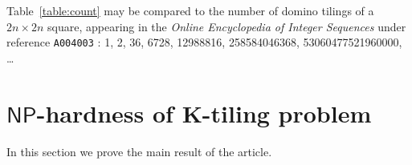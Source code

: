 \documentclass[11pt,a4paper]{article}
\newtheorem{fact}{\textbf{Fact}}
\newcommand{\1}{\mathbb{1}}
\newcommand{\0}{\mathbb{0}}
\newcommand{\NP}{{\mathsf{NP}}}
\newcommand{\hdomino}[2]{\raisebox{-4pt}{\tikz[scale=.5]{\draw[black!25] (1,0) -- ++ (0,1); \draw (0,0) rectangle ++ (2,1); \node at (.5,.5) {\scriptsize $#1$}; \node at (1.5,.5) {\scriptsize $#2$};}}}
\newcommand{\TODO}[1]{{\color{red}\fbox{TODO:} {\sf #1}}}
\begin{document}
Table~\ref{table:count} may be compared to the number of domino tilings of a
$2n \times 2n$ square, appearing in the {\em Online Encyclopedia of Integer
Sequences} under reference {\tt A004003} \cite{oeisA004003}: 1, 2, 36, 6728,
12988816, 258584046368, 53060477521960000, {\dots}

\section{$\NP$-hardness of {\bf K-tiling problem}}
\label{s:NPc}

In this section we prove the main result of the article.

%
%
%
%
%
\end{document}
